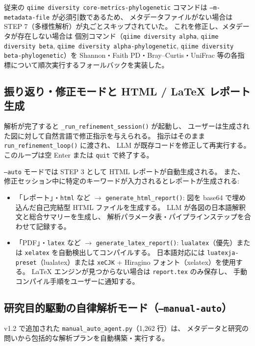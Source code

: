 \documentclass[12pt, a4paper]{article}
\begin{document}
従来の \texttt{qiime diversity core-metrics-phylogenetic} コマンドは
\texttt{--m-metadata-file} が必須引数であるため、
メタデータファイルがない場合は STEP 7（多様性解析）が丸ごとスキップされていた。
これを修正し、メタデータが存在しない場合は
個別コマンド（\texttt{qiime diversity alpha}, \texttt{qiime diversity beta},
\texttt{qiime diversity alpha-phylogenetic}, \texttt{qiime diversity beta-phylogenetic}）を
Shannon・Faith PD・Bray--Curtis・UniFrac 等の各指標について順次実行するフォールバックを実装した。

\subsection{振り返り・修正モードと HTML / LaTeX レポート生成}

解析が完了すると \texttt{\_run\_refinement\_session()} が起動し、
ユーザーは生成された図に対して自然言語で修正指示を与えられる。
指示はそのまま \texttt{run\_refinement\_loop()} に渡され、
LLM が既存コードを修正して再実行する。
このループは空 Enter または \texttt{quit} で終了する。

\texttt{--auto} モードでは STEP 3 として HTML レポートが自動生成される。
また、修正セッション中に特定のキーワードが入力されるとレポートが生成される:

\begin{itemize}
  \item 「レポート」・\texttt{html} など $\to$ \texttt{generate\_html\_report()}:
    図を base64 で埋め込んだ自己完結型 HTML ファイルを生成する。
    LLM が各図の日本語解釈文と総合サマリーを生成し、
    解析パラメータ表・パイプラインステップを合わせて記録する。
  \item 「PDF」・\texttt{latex} など $\to$ \texttt{generate\_latex\_report()}:
    \texttt{lualatex}（優先）または \texttt{xelatex} を自動検出してコンパイルする。
    日本語対応には \texttt{luatexja-preset}（lualatex）または
    \texttt{xeCJK} + Hiragino フォント（xelatex）を使用する。
    LaTeX エンジンが見つからない場合は \texttt{report.tex} のみ保存し、
    手動コンパイル手順をユーザーに通知する。
\end{itemize}

\subsection{研究目的駆動の自律解析モード（\texttt{--manual-auto}）}

v1.2 で追加された \texttt{manual\_auto\_agent.py}（1,262 行）は、
メタデータと研究の問いから包括的な解析プランを自動構築・実行する。
\end{document}
